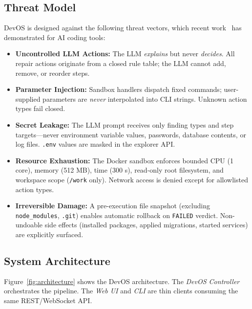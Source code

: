 \documentclass[conference,10pt,caption=false]{IEEEtran}
\begin{document}
\subsection{Threat Model}
\label{sec:threat-model}
DevOS is designed against the following threat vectors, which recent work~\cite{llm-code-security, prompt-injection, security-audit} has demonstrated for AI coding tools:
\begin{itemize}[leftmargin=*, nosep]
    \item \textbf{Uncontrolled LLM Actions:} The LLM \textit{explains} but never \textit{decides}. All repair actions originate from a closed rule table; the LLM cannot add, remove, or reorder steps.
    \item \textbf{Parameter Injection:} Sandbox handlers dispatch fixed commands; user-supplied parameters are \textit{never} interpolated into CLI strings. Unknown action types fail closed.
    \item \textbf{Secret Leakage:} The LLM prompt receives only finding types and step targets---never environment variable values, passwords, database contents, or log files. \texttt{.env} values are masked in the explorer API.
    \item \textbf{Resource Exhaustion:} The Docker sandbox enforces bounded CPU (1 core), memory (512 MB), time (300 s), read-only root filesystem, and workspace scope (\texttt{/work} only). Network access is denied except for allowlisted action types.
    \item \textbf{Irreversible Damage:} A pre-execution file snapshot (excluding \texttt{node\_modules}, \texttt{.git}) enables automatic rollback on \texttt{FAILED} verdict. Non-undoable side effects (installed packages, applied migrations, started services) are explicitly surfaced.
\end{itemize}

\subsection{System Architecture}
\label{sec:architecture}
Figure~\ref{fig:architecture} shows the DevOS architecture. The \textit{DevOS Controller} orchestrates the pipeline. The \textit{Web UI} and \textit{CLI} are thin clients consuming the same REST/WebSocket API.
\end{document}
